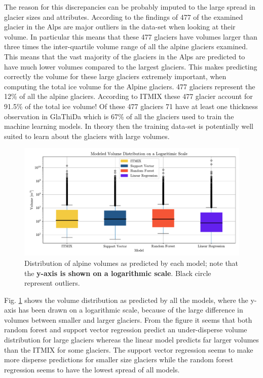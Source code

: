 The reason for this discrepancies can be probably imputed to the large spread in glacier sizes and attributes. According to the findings of \citet{Farinotti2019} 477 of the examined glacier in the Alps are major outliers in the data-set when looking at their volume. In particular this means that these 477 glaciers have volumes larger than three times the inter-quartile volume range of all the alpine glaciers examined. This means that the vast majority of the glaciers in the Alps are predicted to have much lower volumes compared to the largest glaciers. This makes predicting correctly the volume for these large glaciers extremely important, when computing the total ice volume for the Alpine glaciers. 477 glaciers represent the 12\% of all the alpine glaciers. According to ITMIX these 477 glacier account for 91.5\% of the total ice volume! Of these 477 glaciers 71 have at least one thickness observation in GlaThiDa which is 67\% of all the glaciers used to train the machine learning models. In theory then the training data-set is potentially well suited to learn about the glaciers with large volumes.  

\begin{figure}[!tp]
	\centering		  
	\includegraphics[width=1.\textwidth]{figures/vol_box.pdf}
	\caption{Distribution of alpine volumes as predicted by each model; note that the \textbf{y-axis is shown on a logarithmic scale}. Black circle represent outliers.}
	\label{fig:vol-dist}
\end{figure}

Fig. \ref{fig:vol-dist} shows the volume distribution as predicted by all the models, where the y-axis has been drawn on a logarithmic scale, because of the large difference in volumes between smaller and larger glaciers. From the figure it seems that both random forest and support vector regression predict an under-disperse volume distribution for large glaciers whereas the linear model predicts far larger volumes than the ITMIX for some glaciers. The support vector regression seems to make more disperse predictions for smaller size glaciers while the random forest regression seems to have the lowest spread of all models.

